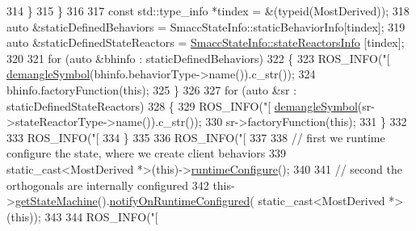 \begin{DoxyCode}
{{{{314         \}
315       \}
316 
317       \textcolor{keyword}{const} std::type\_info *tindex = &(\textcolor{keyword}{typeid}(MostDerived));
318       \textcolor{keyword}{auto} &staticDefinedBehaviors = SmaccStateInfo::staticBehaviorInfo[tindex];
319       \textcolor{keyword}{auto} &staticDefinedStateReactors = \hyperlink{classsmacc_1_1introspection_1_1SmaccStateInfo_abd1d6ca5060c87f6bd11fde3e5b2ac4d}{SmaccStateInfo::stateReactorsInfo}
      [tindex];
320 
321       \textcolor{keywordflow}{for} (\textcolor{keyword}{auto} &bhinfo : staticDefinedBehaviors)
322       \{
323         ROS\_INFO(\textcolor{stringliteral}{"[%
      \hyperlink{namespacesmacc_1_1introspection_a2f495108db3e57604d8d3ff5ef030302}{demangleSymbol}(bhinfo.behaviorType->name()).c\_str());
324         bhinfo.factoryFunction(\textcolor{keyword}{this});
325       \}
326 
327       \textcolor{keywordflow}{for} (\textcolor{keyword}{auto} &sr : staticDefinedStateReactors)
328       \{
329         ROS\_INFO(\textcolor{stringliteral}{"[%
      \hyperlink{namespacesmacc_1_1introspection_a2f495108db3e57604d8d3ff5ef030302}{demangleSymbol}(sr->stateReactorType->name()).c\_str());
330         sr->factoryFunction(\textcolor{keyword}{this});
331       \}
332 
333       ROS\_INFO(\textcolor{stringliteral}{"[%
334     \}
335 
336     ROS\_INFO(\textcolor{stringliteral}{"[%
337 
338     \textcolor{comment}{// first we runtime configure the state, where we create client behaviors}
339     \textcolor{keyword}{static\_cast<}MostDerived *\textcolor{keyword}{>}(\textcolor{keyword}{this})->\hyperlink{classsmacc_1_1SmaccState_a6995704a0232e24f4c38250302c0a01f}{runtimeConfigure}();
340 
341     \textcolor{comment}{// second the orthogonals are internally configured}
342     this->\hyperlink{classsmacc_1_1SmaccState_afc39f8e0ca4001b2159a100da2fccd0e}{getStateMachine}().\hyperlink{classsmacc_1_1ISmaccStateMachine_a7377ca0f79289fdc27f9ed3ff6e67263}{notifyOnRuntimeConfigured}(
      static\_cast<MostDerived *>(\textcolor{keyword}{this}));
343 
344     ROS\_INFO(\textcolor{stringliteral}{"[%
}}}}}}}}}
\end{DoxyCode}
